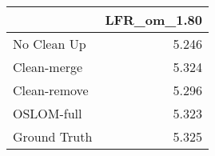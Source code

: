 \begin{tabular}{lr}
\toprule
{} & LFR_om_1.80 \\
\midrule
No Clean Up  &       5.246 \\
Clean-merge  &       5.324 \\
Clean-remove &       5.296 \\
OSLOM-full   &       5.323 \\
Ground Truth &       5.325 \\
\bottomrule
\end{tabular}
